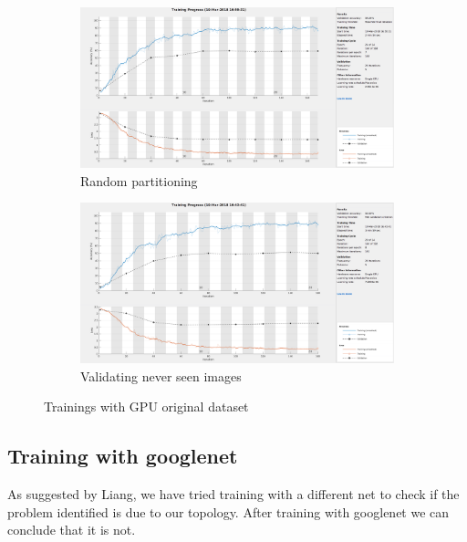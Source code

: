 \documentclass[]{article}
\begin{document}
\begin{figure}[h]
	\centering
	\begin{subfigure}[b]{0.49\textwidth}
		\includegraphics[width=\textwidth]{gpu_before_aug.png}
		\caption{Random partitioning}
	\end{subfigure}
	\begin{subfigure}[b]{0.5\textwidth}
		\includegraphics[width=\textwidth]{gpu_before_aug_ric__validation.png}
		\caption{Validating never seen images}
	\end{subfigure}
	
	\caption{Trainings with GPU original dataset}
\end{figure}

\subsection{Training with googlenet}

As suggested by Liang, we have tried training with a different net to check if the problem identified is due to our topology. After training with googlenet we can conclude that it is not.
\end{document}

